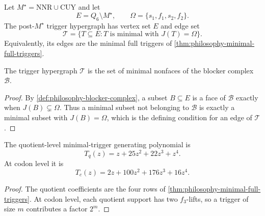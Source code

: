 \begin{definition}
\label{def:philosophy-trigger-hypergraph}
Let $M^{\star}=\mathrm{NNR}\cup\mathrm{CUY}$ and let
$$
  E=Q_{6}\setminus M^{\star},
  \qquad
  \Omega=\{s_{1},f_{1},s_{2},f_{2}\}.
$$
The post-$M^{\star}$ trigger hypergraph has vertex set $E$ and edge set
$$
  \mathcal{T}
  =
  \{T\subseteq E:T\text{ is minimal with }J(T)=\Omega\}.
$$
Equivalently, its edges are the minimal full triggers of
\autoref{thm:philosophy-minimal-full-triggers}.
\end{definition}

\begin{theorem}
\label{thm:philosophy-trigger-hypergraph-nonfaces}
The trigger hypergraph $\mathcal{T}$ is the set of minimal nonfaces of
the blocker complex $\mathcal{B}$.
\end{theorem}
\begin{proof}
By \autoref{def:philosophy-blocker-complex}, a subset $B\subseteq E$ is
a face of $\mathcal{B}$ exactly when $J(B)\subsetneq\Omega$. Thus a
minimal subset not belonging to $\mathcal{B}$ is exactly a minimal
subset with $J(B)=\Omega$, which is the defining condition for an edge
of $\mathcal{T}$.
\end{proof}

\begin{theorem}
\label{thm:philosophy-minimal-trigger-polynomials}
The quotient-level minimal-trigger generating polynomial is
$$
  T_{q}(z)=z+25z^{2}+22z^{3}+z^{4}.
$$
At codon level it is
$$
  T_{c}(z)=2z+100z^{2}+176z^{3}+16z^{4}.
$$
\end{theorem}
\begin{proof}
The quotient coefficients are the four rows of
\autoref{thm:philosophy-minimal-full-triggers}. At codon level, each
quotient support has two $f_{3}$-lifts, so a trigger of size $m$
contributes a factor $2^{m}$.
\end{proof}

